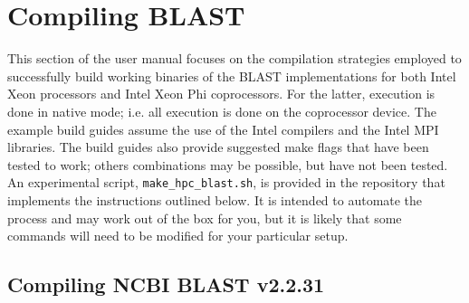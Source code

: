 \documentclass[10pt]{article}
\begin{document}
\clearpage

\section{Compiling BLAST} \label{sec:compile}

This section of the user manual focuses on the compilation strategies employed to successfully build working binaries of the BLAST implementations for both Intel Xeon processors and Intel Xeon Phi coprocessors.  For the latter,
execution is done in native mode; i.e. all execution is done on the coprocessor device.  The example build guides assume the use of the Intel compilers and the Intel MPI libraries.  The build guides also provide suggested make
flags that have been tested to work; others combinations may be possible, but have not been tested.\\

An experimental script, \verb^make_hpc_blast.sh^, is provided in the repository that implements the instructions outlined below. It is intended to automate the process and may
work out of the box for you, but it is likely that some commands will need to be modified for your particular setup. \\


\subsection{Compiling NCBI BLAST v2.2.31} \label{ssec:ncbi-compile}
\end{document}
